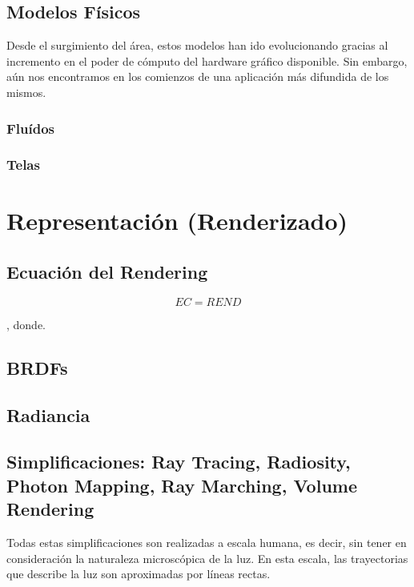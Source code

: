 \documentclass[spanish,a4paper,openright,11pt]{book}
\begin{document}



\subsection{Modelos Físicos}
Desde el surgimiento del área, estos modelos han ido evolucionando gracias al incremento en el poder de cómputo del hardware gráfico disponible. Sin embargo, aún nos encontramos en los comienzos de una aplicación más difundida de los mismos.
\subsubsection{Fluídos}
\subsubsection{Telas}

\section{Representación (Renderizado)}
\subsection{Ecuación del Rendering}

\begin{equation}
EC  = REND
\end{equation}

, donde.


\subsection{BRDFs}
\subsection{Radiancia}
\subsection{Simplificaciones: Ray Tracing, Radiosity, Photon Mapping, Ray Marching, Volume Rendering }
Todas estas simplificaciones son realizadas a escala humana, es decir, sin tener en consideración la naturaleza microscópica de la luz. En esta escala, las trayectorias que describe la luz son aproximadas por líneas rectas.
\end{document}

